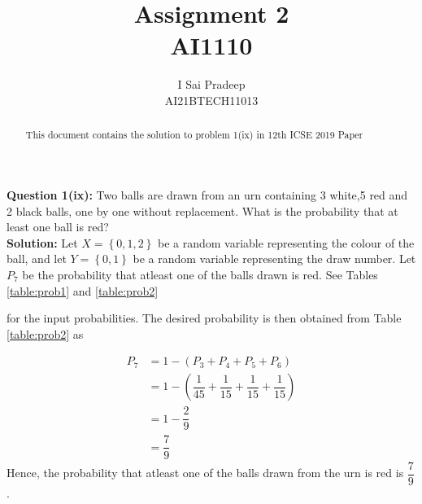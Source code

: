 \documentclass[journal,12pt,twocolumn]{IEEEtran}
\providecommand{\cbrak}[1]{\ensuremath{\left\{#1\right\}}}
\begin{document}
	\title{\huge{Assignment 2}\\AI1110}
	\author{\Large{I Sai Pradeep}\\AI21BTECH11013}
	\maketitle
	\begin{abstract}
		This document contains the solution to problem 1(ix) in 12th ICSE 2019 Paper
	\end{abstract}
	\noindent \textbf{Question 1(ix):}
	Two balls are drawn from an urn containing 3 white,5 red and 2 black balls, one by one without replacement. What is the probability that at least one ball is red?\\	
	\textbf{Solution:} Let $X=\cbrak{0,1,2}$ be a random variable representing the colour of the ball, and let $Y=\cbrak{0,1}$ be a random variable representing the draw number. Let $P_7$ be the probability that atleast one of the balls drawn is red.
	See Tables 
	\eqref{table:prob1}
	and 
	\eqref{table:prob2} 
	\begin{table}[ht!]
		
		\vspace*{5pt}
		\caption{}
		\label{table:prob1}
	\end{table}
	\begin{table}[ht!]
		
		\vspace*{5pt}
		\caption{}
		\label{table:prob2}
	\end{table}
	for the input probabilities.
	The desired probability is then obtained from Table \eqref{table:prob2} as
	
	\begin{align}
		P_7 &=1-(P_3+P_4+P_5+P_6) \\
		&= 1-(\dfrac{1}{45}+ \dfrac{1}{15} + \dfrac{1}{15} + \dfrac{1}{15}) \\
		&= 1-\dfrac{2}{9}\\
		&= \dfrac{7}{9}
	\end{align}
	Hence, the probability that atleast one of the balls drawn from the urn is red is $\dfrac{7}{9}$.
\end{document}
